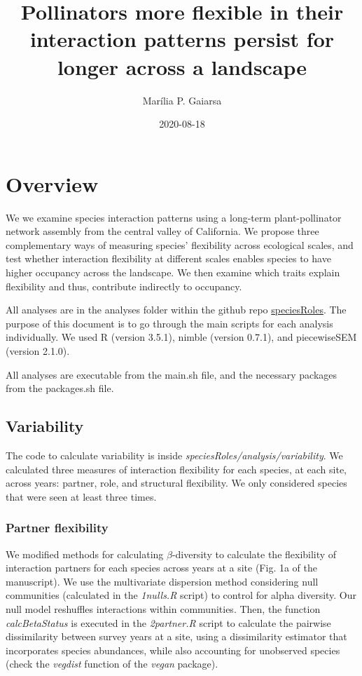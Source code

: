 \documentclass[
]{article}
\title{Pollinators more flexible in their interaction patterns persist
for longer across a landscape}
\author{Marília P. Gaiarsa}
\date{2020-08-18}
\begin{document}
\maketitle

\hypertarget{overview}{%
\section{Overview}\label{overview}}

We we examine species interaction patterns using a long-term
plant-pollinator network assembly from the central valley of California.
We propose three complementary ways of measuring species' flexibility
across ecological scales, and test whether interaction flexibility at
different scales enables species to have higher occupancy across the
landscape. We then examine which traits explain flexibility and thus,
contribute indirectly to occupancy.

All analyses are in the analyses folder within the github repo
\href{https://github.com/lponisio/speciesRoles/tree/master/analysis}{speciesRoles}.
The purpose of this document is to go through the main scripts for each
analysis individually. We used R (version 3.5.1), nimble (version
0.7.1), and piecewiseSEM (version 2.1.0).

All analyses are executable from the main.sh file, and the necessary
packages from the packages.sh file.

\hypertarget{variability}{%
\subsection{Variability}\label{variability}}

The code to calculate variability is inside
\emph{speciesRoles/analysis/variability}. We calculated three measures
of interaction flexibility for each species, at each site, across years:
partner, role, and structural flexibility. We only considered species
that were seen at least three times.

\hypertarget{partner-flexibility}{%
\subsubsection{Partner flexibility}\label{partner-flexibility}}

We modified methods for calculating \(\beta\)-diversity to calculate the
flexibility of interaction partners for each species across years at a
site (Fig. 1a of the manuscript). We use the multivariate dispersion
method considering null communities (calculated in the \emph{1nulls.R}
script) to control for alpha diversity. Our null model reshuffles
interactions within communities. Then, the function
\emph{calcBetaStatus} is executed in the \emph{2partner.R} script to
calculate the pairwise dissimilarity between survey years at a site,
using a dissimilarity estimator that incorporates species abundances,
while also accounting for unobserved species (check the \emph{vegdist}
function of the \emph{vegan} package).
\end{document}
